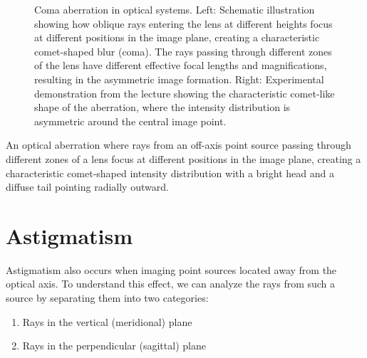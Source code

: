 \documentclass[
  a4paper,
]{book}
\providecommand{\tightlist}{%
  \setlength{\itemsep}{0pt}\setlength{\parskip}{0pt}}
\begin{document}
\begin{figure}
\begin{minipage}{0.50\linewidth}
{}


\end{minipage}%

\caption{\label{fig-coma}Coma aberration in optical systems. Left:
Schematic illustration showing how oblique rays entering the lens at
different heights focus at different positions in the image plane,
creating a characteristic comet-shaped blur (coma). The rays passing
through different zones of the lens have different effective focal
lengths and magnifications, resulting in the asymmetric image formation.
Right: Experimental demonstration from the lecture showing the
characteristic comet-like shape of the aberration, where the intensity
distribution is asymmetric around the central image point.}

\end{figure}%

\begin{tcolorbox}[enhanced jigsaw, coltitle=black, title=\textcolor{quarto-callout-note-color}{\faInfo}\hspace{0.5em}{Coma}, colframe=quarto-callout-note-color-frame, toprule=.15mm, opacitybacktitle=0.6, left=2mm, opacityback=0, breakable, toptitle=1mm, bottomtitle=1mm, leftrule=.75mm, arc=.35mm, titlerule=0mm, colbacktitle=quarto-callout-note-color!10!white, rightrule=.15mm, bottomrule=.15mm, colback=white]

An optical aberration where rays from an off-axis point source passing
through different zones of a lens focus at different positions in the
image plane, creating a characteristic comet-shaped intensity
distribution with a bright head and a diffuse tail pointing radially
outward.

\end{tcolorbox}

\section{Astigmatism}\label{astigmatism}

Astigmatism also occurs when imaging point sources located away from the
optical axis. To understand this effect, we can analyze the rays from
such a source by separating them into two categories:

\begin{enumerate}
\def\labelenumi{\arabic{enumi}.}
\tightlist
\item
  Rays in the vertical (meridional) plane
\item
  Rays in the perpendicular (sagittal) plane
\end{enumerate}
\end{document}
